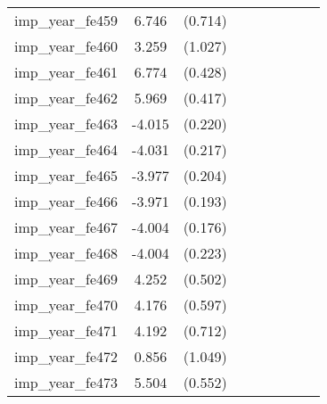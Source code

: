 {\begin{tabular}{l*{4}{cc}}
imp\_year\_fe459&    6.746\sym{***}&  (0.714)&                  &         &                  &         &                  &         \\
imp\_year\_fe460&    3.259\sym{**} &  (1.027)&                  &         &                  &         &                  &         \\
imp\_year\_fe461&    6.774\sym{***}&  (0.428)&                  &         &                  &         &                  &         \\
imp\_year\_fe462&    5.969\sym{***}&  (0.417)&                  &         &                  &         &                  &         \\
imp\_year\_fe463&   -4.015\sym{***}&  (0.220)&                  &         &                  &         &                  &         \\
imp\_year\_fe464&   -4.031\sym{***}&  (0.217)&                  &         &                  &         &                  &         \\
imp\_year\_fe465&   -3.977\sym{***}&  (0.204)&                  &         &                  &         &                  &         \\
imp\_year\_fe466&   -3.971\sym{***}&  (0.193)&                  &         &                  &         &                  &         \\
imp\_year\_fe467&   -4.004\sym{***}&  (0.176)&                  &         &                  &         &                  &         \\
imp\_year\_fe468&   -4.004\sym{***}&  (0.223)&                  &         &                  &         &                  &         \\
imp\_year\_fe469&    4.252\sym{***}&  (0.502)&                  &         &                  &         &                  &         \\
imp\_year\_fe470&    4.176\sym{***}&  (0.597)&                  &         &                  &         &                  &         \\
imp\_year\_fe471&    4.192\sym{***}&  (0.712)&                  &         &                  &         &                  &         \\
imp\_year\_fe472&    0.856         &  (1.049)&                  &         &                  &         &                  &         \\
imp\_year\_fe473&    5.504\sym{***}&  (0.552)&                  &         &                  &         &                  &         \\

\end{tabular}}
